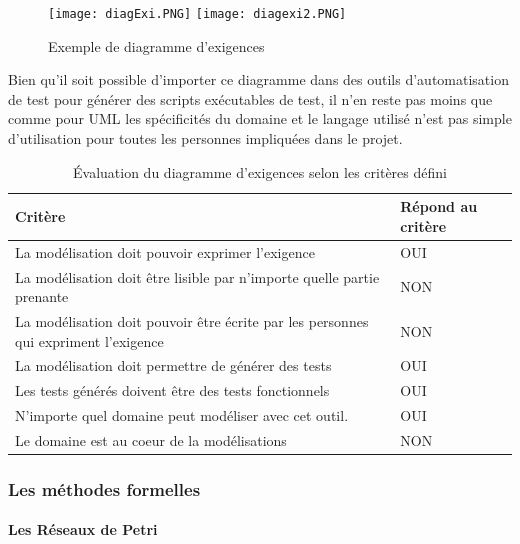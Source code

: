          \begin{figure}[H]
            \centering
            \texttt{[image: diagExi.PNG]}
            \texttt{[image: diagexi2.PNG]}
            \caption{Exemple de diagramme d'exigences~\cite{diagExi}}
        \end{figure}
    
        Bien qu'il soit possible d'importer ce diagramme dans des outils d'automatisation de test pour générer des scripts exécutables de test, il n'en reste pas moins que comme pour UML les spécificités du domaine et le langage utilisé n'est pas simple d'utilisation pour toutes les personnes impliquées dans le projet.
    
        \begin{table}[H]
        \centering
         \begin{tabular}{|p{25em}|p{5em}|} 
         \hline
        Critère & Répond au critère \\ [0.5ex] 
         \hline
         La modélisation doit pouvoir exprimer l’exigence & \cellcolor[HTML]{699A73}OUI\\
         \hline
        La modélisation doit être lisible par n’importe quelle partie prenante & \cellcolor[HTML]{D03737}NON\\
         \hline
        La modélisation doit pouvoir être écrite par les personnes qui expriment l’exigence &\cellcolor[HTML]{D03737} NON \\
         \hline
        La modélisation doit permettre de générer des tests & \cellcolor[HTML]{699A73}OUI \\
         \hline
        Les tests générés doivent être des tests fonctionnels &\cellcolor[HTML]{699A73} OUI\\ 
         \hline
        N’importe quel domaine peut modéliser avec cet outil.&\cellcolor[HTML]{699A73} OUI\\ 
         \hline
        Le domaine est au coeur de la modélisations &\cellcolor[HTML]{D03737} NON\\ 
        \hline 
        \end{tabular}
        \caption{Évaluation du diagramme d'exigences selon les critères défini}
        \end{table}
        
        \subsubsection{Les méthodes formelles}
        
        \paragraph{Les Réseaux de Petri}
        
